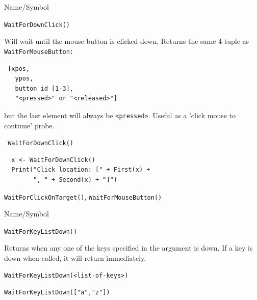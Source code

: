 \begin{desc}{Name/Symbol}
\item[Name/Symbol]  	\verb+WaitForDownClick()+

\item[Description]	Will wait until the mouse button is clicked down.  Returns
  the same 4-tuple as \verb+WaitForMouseButton:+
\begin{verbatim}
 [xpos,
   ypos, 
   button id [1-3], 
   "<pressed>" or "<released>"]
\end{verbatim}
 but the last element will always be \verb+<pressed>+.
 Useful as a 'click mouse to continue' probe.

\item[Usage]		
 \verb+ WaitForDownClick()+

\item[Example]	
\begin{verbatim}
  x <- WaitForDownClick()
  Print("Click location: [" + First(x) + 
        ", " + Second(x) + "]")  
\end{verbatim}

\item[See Also]	
  \verb+WaitForClickOnTarget()+, \verb+WaitForMouseButton()+
\end{desc}




\begin{desc}{Name/Symbol}
\item[Name/Symbol]  	\verb+WaitForKeyListDown()+

\item[Description] Returns when any one of the keys specified in the
  argument is down. If a key is down when called, it will return immediately.

\item[Usage]
\begin{verbatim}
WaitForKeyListDown(<list-of-keys>)
\end{verbatim}

\item[Example]     	
\begin{verbatim}
WaitForKeyListDown(["a","z"])
\end{verbatim}

\item[See Also]	
 \end{desc}







